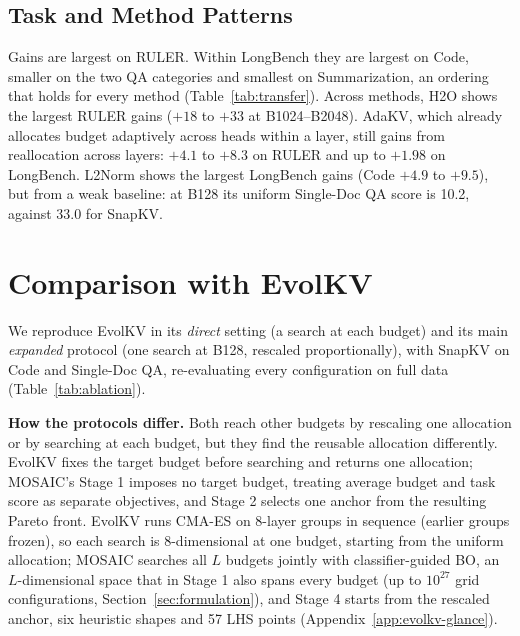 \documentclass[11pt]{article}
\begin{document}
\subsection{Task and Method Patterns}

Gains are largest on RULER. Within LongBench they are largest on Code, smaller on the two QA categories and smallest on Summarization, an ordering that holds for every method (Table~\ref{tab:transfer}). Across methods, H2O shows the largest RULER gains ($+18$ to $+33$ at B1024--B2048). AdaKV, which already allocates budget adaptively across heads within a layer, still gains from reallocation across layers: $+4.1$ to $+8.3$ on RULER and up to $+1.98$ on LongBench. L2Norm shows the largest LongBench gains (Code $+4.9$ to $+9.5$), but from a weak baseline: at B128 its uniform Single-Doc QA score is 10.2, against 33.0 for SnapKV.

\section{Comparison with EvolKV}
\label{sec:evolkv}

We reproduce EvolKV \citep{yu2025evolkv} in its \emph{direct} setting (a search at each budget) and its main \emph{expanded} protocol (one search at B128, rescaled proportionally), with SnapKV on Code and Single-Doc QA, re-evaluating every configuration on full data (Table~\ref{tab:ablation}).

\textbf{How the protocols differ.} Both reach other budgets by rescaling one allocation or by searching at each budget, but they find the reusable allocation differently. EvolKV fixes the target budget before searching and returns one allocation; MOSAIC's Stage 1 imposes no target budget, treating average budget and task score as separate objectives, and Stage 2 selects one anchor from the resulting Pareto front. EvolKV runs CMA-ES on 8-layer groups in sequence (earlier groups frozen), so each search is 8-dimensional at one budget, starting from the uniform allocation; MOSAIC searches all $L$ budgets jointly with classifier-guided BO, an $L$-dimensional space that in Stage 1 also spans every budget (up to $10^{27}$ grid configurations, Section~\ref{sec:formulation}), and Stage 4 starts from the rescaled anchor, six heuristic shapes and 57 LHS points (Appendix~\ref{app:evolkv-glance}).
\end{document}
